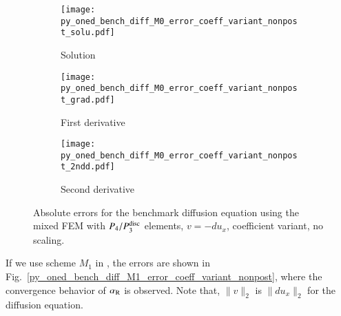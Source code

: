 \documentclass[review,3p]{elsarticle}
\begin{document}
\begin{figure}[!ht]
    \begin{subfigure}{5.5cm}
        \texttt{[image: py\_oned\_bench\_diff\_M0\_error\_coeff\_variant\_nonpost\_solu.pdf]}
        \caption{Solution}
        \label{py_oned_bench_diff_M0_error_coeff_variant_nonpost_solu}
    \end{subfigure}
    \hspace{-0.2cm}
    \begin{subfigure}{5.5cm}
        \texttt{[image: py\_oned\_bench\_diff\_M0\_error\_coeff\_variant\_nonpost\_grad.pdf]}
        \caption{First derivative}
        \label{py_oned_bench_diff_M0_error_coeff_variant_nonpost_grad}
    \end{subfigure}
    \hspace{-0.2cm}
    \begin{subfigure}{5.5cm}
        \texttt{[image: py\_oned\_bench\_diff\_M0\_error\_coeff\_variant\_nonpost\_2ndd.pdf]}
        \caption{Second derivative}
        \label{py_oned_bench_diff_M0_error_coeff_variant_nonpost_2ndd}
    \end{subfigure}
\caption{Absolute errors for the benchmark diffusion equation using the mixed FEM with $P_4/P_3^{\rm disc}$ elements, $v=-du_x$, coefficient variant, no scaling.}
\label{py_oned_bench_diff_M0_error_coeff_variant_nonpost}
\end{figure}


If we use scheme $M_1$ in \cite{liu2019balancing}, the errors are shown in Fig.~\ref{py_oned_bench_diff_M1_error_coeff_variant_nonpost}, where the convergence behavior of $\alpha_{\rm R}$ is observed. Note that, $\|v\|_2$ is $\|du_x\|_2$ for the diffusion equation.
\end{document}

